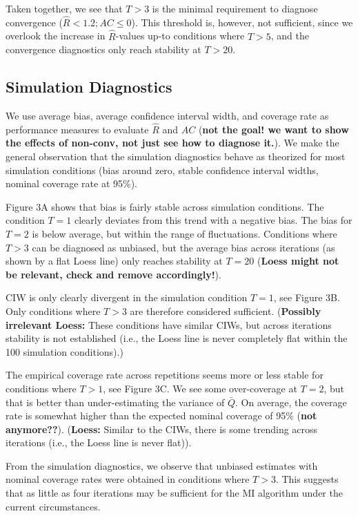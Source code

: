 \documentclass[Royal,times,sageh]{sagej}
\begin{document}
Taken together, we see that \(T>3\) is the minimal requirement to
diagnose convergence (\(\widehat{R} < 1.2; AC \leq 0\)). This threshold
is, however, not sufficient, since we overlook the increase in
\(\widehat{R}\)-values up-to conditions where \(T>5\), and the
convergence diagnostics only reach stability at \(T>20\).

\hypertarget{simulation-diagnostics}{%
\subsection{Simulation Diagnostics}\label{simulation-diagnostics}}

We use average bias, average confidence interval width, and coverage
rate as performance measures to evaluate \(\widehat{R}\) and \(AC\)
(\textbf{not the goal! we want to show the effects of non-conv, not just
see how to diagnose it.}). We make the general observation that the
simulation diagnostics behave as theorized for most simulation
conditions (bias around zero, stable confidence interval widths, nominal
coverage rate at 95\%).

Figure 3A shows that bias is fairly stable across simulation conditions.
The condition \(T=1\) clearly deviates from this trend with a negative
bias. The bias for \(T=2\) is below average, but within the range of
fluctuations. Conditions where \(T>3\) can be diagnosed as unbiased, but
the average bias across iterations (as shown by a flat Loess line) only
reaches stability at \(T=20\) (\textbf{Loess might not be relevant,
check and remove accordingly!}).

CIW is only clearly divergent in the simulation condition \(T=1\), see
Figure 3B. Only conditions where \(T>3\) are therefore considered
sufficient. (\textbf{Possibly irrelevant Loess:} These conditions have
similar CIWs, but across iterations stability is not established (i.e.,
the Loess line is never completely flat within the 100 simulation
conditions).)

The empirical coverage rate across repetitions seems more or less stable
for conditions where \(T>1\), see Figure 3C. We see some over-coverage
at \(T=2\), but that is better than under-estimating the variance of
\(\bar{Q}\). On average, the coverage rate is somewhat higher than the
expected nominal coverage of 95\% \citep{neym34} (\textbf{not
anymore??}). (\textbf{Loess:} Similar to the CIWs, there is some
trending across iterations (i.e., the Loess line is never flat)).

From the simulation diagnostics, we observe that unbiased estimates with
nominal coverage rates were obtained in conditions where \(T>3\). This
suggests that as little as four iterations may be sufficient for the MI
algorithm under the current circumstances.
\end{document}
